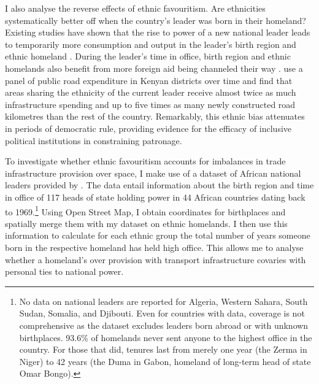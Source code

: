 \documentclass[11pt, oneside]{article}   	%
\begin{document}
I also analyse the reverse effects of ethnic favouritism. Are ethnicities systematically better off when the country's leader was born in their homeland? Existing studies have shown that the rise to power of a new national leader leads to temporarily more consumption and output in the leader's birth region \citep{Hodler_RegionalFavoritism_2014} and ethnic homeland \citep{DeLuca_Ethnicfavoritismaxiom_2018}. During the leader's time in office, birth region and ethnic homelands also benefit from more foreign aid being channeled their way \citep{Dreher_AiddemandAfrican_2016}. \cite{Burgess_ValueDemocracyEvidence_2015} use a panel of public road expenditure in Kenyan districts over time and find that areas sharing the ethnicity of the current leader receive almost twice as much infrastructure spending and up to five times as many newly constructed road kilometres than the rest of the country. Remarkably, this ethnic bias attenuates in periods of democratic rule, providing evidence for the efficacy of inclusive political institutions in constraining patronage.

To investigate whether ethnic favouritism accounts for imbalances in trade infrastructure provision over space, I make use of a dataset of African national leaders provided by \cite{Dreher_AiddemandAfrican_2016}. The data entail information about the birth region and time in office of 117 heads of state holding power in 44 African countries dating back to 1969.\footnote{No data on national leaders are reported for Algeria, Western Sahara, South Sudan, Somalia, and Djibouti. Even for countries with data, coverage is not comprehensive as the dataset excludes leaders born abroad or with unknown birthplaces. 93.6\% of homelands never sent anyone to the highest office in the country. For those that did, tenures last from merely one year (the Zerma in Niger) to 42 years (the Duma in Gabon, homeland of long-term head of state Omar Bongo).} Using Open Street Map, I obtain coordinates for birthplaces and spatially merge them with my dataset on ethnic homelands. I then use this information to calculate for each ethnic group the total number of years someone born in the respective homeland has held high office. This allows me to analyse whether a homeland's over provision with transport infrastructure covaries with personal ties to national power.
\end{document}

